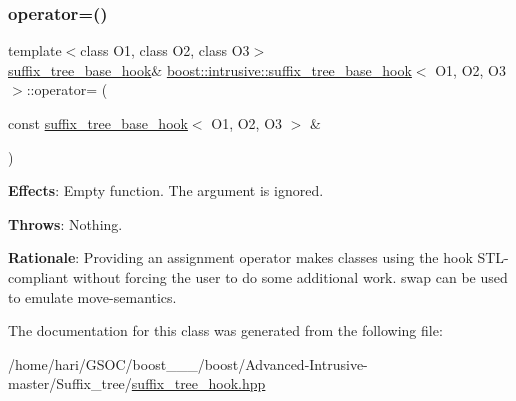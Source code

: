 \subsubsection{\texorpdfstring{operator=()}{operator=()}}
{\footnotesize\ttfamily template$<$class O1, class O2, class O3$>$ \\
\hyperlink{classboost_1_1intrusive_1_1suffix__tree__base__hook}{suffix\+\_\+tree\+\_\+base\+\_\+hook}\& \hyperlink{classboost_1_1intrusive_1_1suffix__tree__base__hook}{boost\+::intrusive\+::suffix\+\_\+tree\+\_\+base\+\_\+hook}$<$ O1, O2, O3 $>$\+::operator= (\begin{DoxyParamCaption}\item[{const \hyperlink{classboost_1_1intrusive_1_1suffix__tree__base__hook}{suffix\+\_\+tree\+\_\+base\+\_\+hook}$<$ O1, O2, O3 $>$ \&}]{ }\end{DoxyParamCaption})}

{\bfseries Effects}\+: Empty function. The argument is ignored.

{\bfseries Throws}\+: Nothing.

{\bfseries Rationale}\+: Providing an assignment operator makes classes using the hook S\+T\+L-\/compliant without forcing the user to do some additional work. {\ttfamily swap} can be used to emulate move-\/semantics. 

The documentation for this class was generated from the following file\+:\begin{DoxyCompactItemize}
\item 
/home/hari/\+G\+S\+O\+C/boost\+\_\+\_\+\_/boost/\+Advanced-\/\+Intrusive-\/master/\+Suffix\+\_\+tree/\hyperlink{suffix__tree__hook_8hpp}{suffix\+\_\+tree\+\_\+hook.\+hpp}\end{DoxyCompactItemize}
